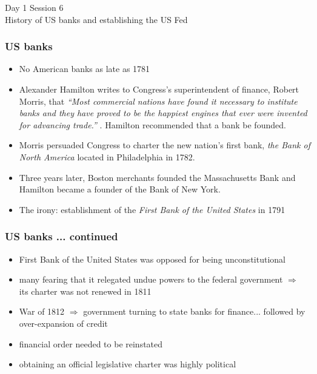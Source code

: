 \documentclass[11pt]{beamer}
\begin{document}
\begin{frame}
\begin{center}
 Day 1 Session 6\\
History of US banks and establishing the US Fed
\end{center}


\end{frame}


\begin{frame}
\frametitle{US banks}
\begin{itemize}
\item No American banks as late as 1781
\item Alexander Hamilton writes to Congress’s superintendent of finance, Robert Morris, that \textit { “Most commercial nations have found it necessary to institute banks and they have proved to be the happiest engines that ever were invented for advancing trade.” }. Hamilton recommended that a bank be founded.
\item Morris persuaded Congress to charter the new nation’s first bank, \textit{the Bank of North America} located in Philadelphia in 1782.
\item Three years later, Boston merchants founded the Massachusetts Bank and Hamilton became a founder of the Bank of New York.
\item The irony: establishment of the \textit{First Bank of the United States} in 1791

\end{itemize}

\end{frame}

\begin{frame}
\frametitle{US banks ... continued}
\begin{itemize}
\item First Bank of the United States was opposed for being unconstitutional
\item many fearing that it relegated undue powers to the federal government $\Rightarrow$ its charter was not renewed in 1811
\item War of 1812 $\Rightarrow$ government turning to state banks for finance... followed by over-expansion of credit
\item financial order needed to be reinstated
\item obtaining an official legislative charter was highly political



\end{itemize}
\end{frame}
\end{document}
